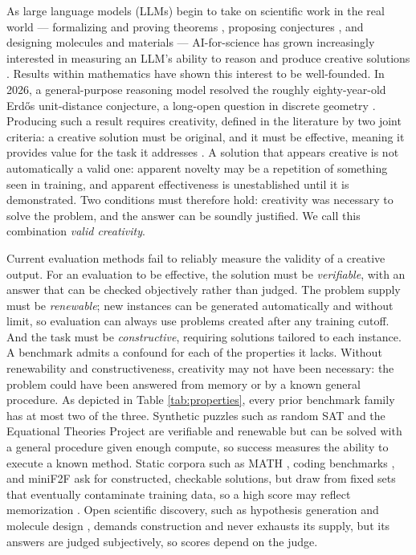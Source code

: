 \documentclass[letterpaper]{article} %
\begin{document}
As large language models (LLMs) begin to take on scientific work in the real world --- formalizing and proving theorems \citep{yang2023leandojo, xin2024deepseek}, proposing conjectures \citep{romera2024mathematical, gottweis2026accelerating, lu2024ai}, and designing molecules and materials \citep{jumper2021highly, merchant2023scaling} --- AI-for-science has grown increasingly interested in measuring an LLM's ability to reason and produce creative solutions \citep{chen2025ai4research}. Results within mathematics have shown this interest to be well-founded. In 2026, a general-purpose reasoning model resolved the roughly eighty-year-old Erdős unit-distance conjecture, a long-open question in discrete geometry \citep{openai2026unitdistance}. Producing such a result requires creativity, defined in the literature by two joint criteria: a creative solution must be original, and it must be effective, meaning it provides value for the task it addresses \citep{runco2012standard}. A solution that appears creative is not automatically a valid one: apparent novelty may be a repetition of something seen in training, and apparent effectiveness is unestablished until it is demonstrated. Two conditions must therefore hold: creativity was necessary to solve the problem, and the answer can be soundly justified. We call this combination \emph{valid creativity}. 





Current evaluation methods fail to reliably measure the validity of a creative output. For an evaluation to be effective, the solution must be \textit{verifiable}, with an answer that can be checked objectively rather than judged. The problem supply must be \textit{renewable}; new instances can be generated automatically and without limit, so evaluation can always use problems created after any training cutoff. And the task must be \textit{constructive}, requiring solutions tailored to each instance. A benchmark admits a confound for each of the properties it lacks. Without renewability and constructiveness, creativity may not have been necessary: the problem could have been answered from memory or by a known general procedure. As depicted in Table \ref{tab:properties}, every prior benchmark family has at most two of the three. Synthetic puzzles such as random SAT \citep{selman1996generating} and the Equational Theories Project \citep{bolan2025equational} are verifiable and renewable but can be solved with a general procedure given enough compute, so success measures the ability to execute a known method. Static corpora such as MATH \citep{hendrycks2021measuring}, coding benchmarks \citep{chen2021evaluating}, and miniF2F \citep{zheng2021minif2f} ask for constructed, checkable solutions, but draw from fixed sets that eventually contaminate training data, so a high score may reflect memorization \citep{xu2024benchmark}. Open scientific discovery, such as hypothesis generation \citep{gottweis2026accelerating, lu2024ai} and molecule design \citep{jumper2021highly}, demands construction and never exhausts its supply, but its answers are judged subjectively, so scores depend on the judge.
\end{document}
